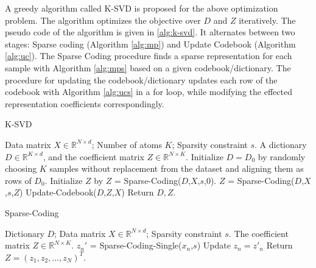A greedy algorithm called K-SVD is proposed for the above optimization
problem. The algorithm optimizes the objective over $D$ and $Z$
iteratively. The pseudo code of the algorithm is given in
\ref{alg:k-svd}. It alternates between two stages: Sparse coding
(Algorithm \ref{alg:mp}) and Update Codebook (Algorithm
\ref{alg:uc}). The Sparse Coding procedure finds a sparse
representation for each sample with Algorithm \ref{alg:mps} based on a
given codebook/dictionary. The procedure for updating the
codebook/dictionary updates each row of the codebook with Algorithm
\ref{alg:ucs} in a for loop, while modifying the effected
representation coefficients correspondingly.  

  \begin{algorithm}[H] 
       \caption{K-SVD}
       \label{alg:k-svd}
       \begin{algorithmic}
       \Require Data matrix $X\in\mathbb R^{N\times d}$; Number of atoms $K$; Sparsity constraint $s$.
       \Ensure A dictionary $D\in\mathbb R^{K\times d}$, and the coefficient matrix $Z\in\mathbb R^{N\times K}$.
          \State Initialize $D=D_0$ by randomly choosing $K$ samples without replacement from the dataset and aligning them as rows of $D_0$. Initialize $Z$ by $Z$ = Sparse-Coding($D$,$X$,$s$,$0$). 
            \State $Z$ = Sparse-Coding($D$,$X$,$s$,$Z$)
            \State Update-Codebook($D$,$Z$,$X$)
          \EndWhile
          \State Return $D,Z$.  
    \EndFunction
       \end{algorithmic}
 \end{algorithm}

  \begin{algorithm}[H] 
       \caption{Sparse-Coding}
       \label{alg:mp}
       \begin{algorithmic}
       \Require Dictionary $D$; Data matrix $X\in\mathbb R^{N\times d}$; Sparsity constraint $s$.
       \Ensure The coefficient matrix $Z\in\mathbb R^{N\times K}$. 
            \State $z_n'$ = Sparse-Coding-Single($x_n$,$s$) 
              \State Update $z_n=z'_n$
            \EndIf
          \EndFor
          \State Return $Z = (z_1,z_2,\dots,z_N)^T$.  
    \EndFunction
       \end{algorithmic}
 \end{algorithm}

